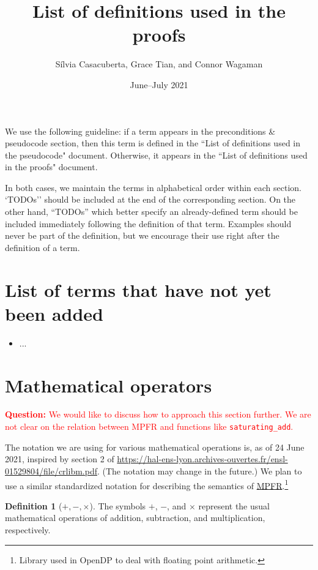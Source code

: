 \documentclass[11pt,a4paper]{article}
\title{List of definitions used in the proofs}
\author{S\'ilvia Casacuberta, Grace Tian, and Connor Wagaman}
\date{June--July 2021}
\theoremstyle{definition}
\newtheorem{definition}{Definition}[section]
\newcommand{\questionc}[1]{\textcolor{red}{\textbf{Question:} #1}}
\begin{document}
\maketitle

We use the following guideline: if a term appears in the preconditions \& pseudocode section, then this term is defined in the ``List of definitions used in the pseudocode" document. Otherwise, it appears in the ``List of definitions used in the proofs" document. 

In both cases, we maintain the terms in alphabetical order within each section. `TODOs'' should be included at the end of the corresponding section. On the other hand, ``TODOs'' which better specify an already-defined term should be included immediately following the definition of that term. Examples should never be part of the definition, but we encourage their use right after the definition of a term.

\tableofcontents

\section*{List of terms that have not yet been added}
\begin{itemize}
\item ...
\end{itemize}

\section{Mathematical operators}
\questionc{We would like to discuss how to approach this section further. We are not clear on the relation between MPFR and functions like \texttt{saturating\_add}.}

The notation we are using for various mathematical operations is, as of 24 June 2021, inspired by section 2 of \url{https://hal-ens-lyon.archives-ouvertes.fr/ensl-01529804/file/crlibm.pdf}. (The notation may change in the future.) We plan to use a similar standardized notation for describing the semantics of \href{https://www.mpfr.org/}{MPFR}.\footnote{Library used in OpenDP to deal with floating point arithmetic.}

\begin{definition}[$+, -, \times$]
    The symbols $+$, $-$, and $\times$ represent the usual mathematical operations of addition, subtraction, and multiplication, respectively.
\end{definition}
\end{document}

